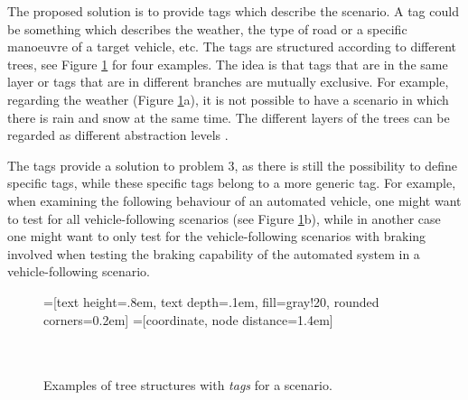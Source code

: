 The proposed solution is to provide tags which describe the scenario. A tag could be something which describes the weather, the type of road or a specific manoeuvre of a target vehicle, etc. The tags are structured according to different trees, see Figure \ref{fig:tag trees} for four examples. The idea is that tags that are in the same layer or tags that are in different branches are mutually exclusive. For example, regarding the weather (Figure \ref{fig:tag trees}a), it is not possible to have a scenario in which there is rain and snow at the same time. The different layers of the trees can be regarded as different abstraction levels \cite{Bonnin2014}. 

The tags provide a solution to problem 3, as there is still the possibility to define specific tags, while these specific tags belong to a more generic tag. For example, when examining the following behaviour of an automated vehicle, one might want to test for all vehicle-following scenarios (see Figure \ref{fig:tag trees}b), while in another case one might want to only test for the vehicle-following scenarios with braking involved when testing the braking capability of the automated system in a vehicle-following scenario.

\begin{figure}
	\begin{center}
		=[text height=.8em, text depth=.1em, fill=gray!20, rounded corners=0.2em]
		=[coordinate, node distance=1.4em]
		 \\
		\\
		 \\
		\caption{Examples of tree structures with \emph{tags} for a scenario.}
		\label{fig:tag trees}
	\end{center}
\end{figure}
